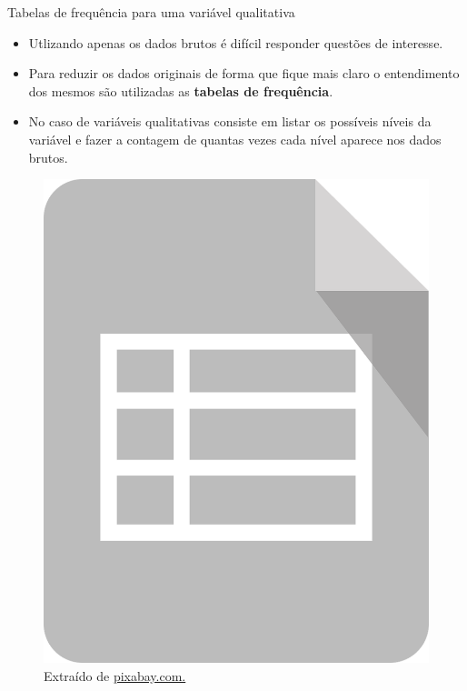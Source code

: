 \documentclass[
  ignorenonframetext,
  serif,
  professionalfont,
  usenames,
  dvipsnames,
  aspectratio = 169]{beamer}
\def\beginAHalfColumn{\begin{minipage}{0.49\textwidth}}%
\def\endColumns{\end{minipage}}%
\begin{document}
\begin{frame}{Tabelas de frequência para uma variável qualitativa}
\protect\hypertarget{tabelas-de-frequuxeancia-para-uma-variuxe1vel-qualitativa}{}
\beginAHalfColumn

\begin{itemize}
\item
  Utlizando apenas os dados brutos é difícil responder questões de
  interesse.
\item
  Para reduzir os dados originais de forma que fique mais claro o
  entendimento dos mesmos são utilizadas as
  \textbf{tabelas de frequência}.
\item
  No caso de variáveis qualitativas consiste em listar os possíveis
  níveis da variável e fazer a contagem de quantas vezes cada nível
  aparece nos dados brutos.
\end{itemize}

\endColumns
\beginAHalfColumn

\begin{figure}

{\centering \includegraphics[width=0.4\linewidth]{./img/tabela} 

}

\caption{Extraído de \href{https://cdn.pixabay.com/photo/2016/12/11/01/28/spreadsheet-icon-1898557_1280.png}{pixabay.com.}}\label{fig:unnamed-chunk-5}
\end{figure}

\endColumns
\end{frame}
\end{document}
